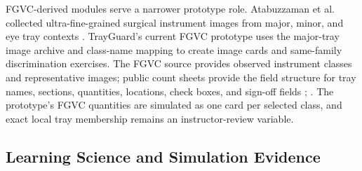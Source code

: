 \documentclass[10pt,a4paper]{article}
\begin{document}
FGVC-derived modules serve a narrower prototype role. Atabuzzaman et al. collected ultra-fine-grained surgical instrument images from major, minor, and eye tray contexts \cite{atabuzzaman-et-al-2025}. TrayGuard's current FGVC prototype uses the major-tray image archive and class-name mapping to create image cards and same-family discrimination exercises. The FGVC source provides observed instrument classes and representative images; public count sheets provide the field structure for tray names, sections, quantities, locations, check boxes, and sign-off fields \cite{stryker-gamma4-count-sheet-2023}; \cite{stryker-imn-count-sheet-2023}. The prototype's FGVC quantities are simulated as one card per selected class, and exact local tray membership remains an instructor-review variable.
\subsection{Learning Science and Simulation Evidence}
\end{document}
